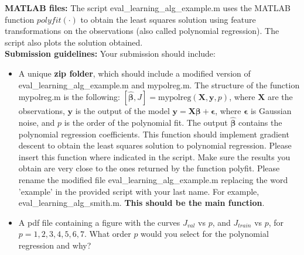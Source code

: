 \documentclass[11pt,oneside,a4paper]{article}
\begin{document}
\begin{enumerate}
\pagebreak
  \textbf{MATLAB files:} The script eval\_learning\_alg\_example.m uses the MATLAB function $polyfit(\cdot)$ to obtain the least squares solution using feature transformations on the observations (also called polynomial regression). The script also plots the solution obtained.
  \\
  \textbf{Submission guidelines:} Your submission should include:
  \begin{itemize}
  	\item A unique \textbf{zip folder}, which should include a modified version of eval\_learning\_alg\_example.m and mypolreg.m. The structure of the function mypolreg.m is the following: $[\hat{\pmb{\beta}}, J]=\text{mypolreg}(\textbf{X},\textbf{y},p)$, where $\textbf{X}$ are the observations, $\textbf{y}$ is the output of the model $\textbf{y}= \textbf{X} \pmb{\beta}+ \pmb{\epsilon}$, where $\pmb{\epsilon}$ is Gaussian noise, and $p$ is the order of the polynomial fit. The output $\hat{\pmb{\beta}}$ contains the polynomial regression coefficients. This function should implement gradient descent to obtain the least squares solution to polynomial regression. Please insert this function where indicated in the script. Make sure the results you obtain are very close to the ones returned by the function polyfit.
  	Please rename the modified file eval\_learning\_alg\_example.m replacing the word 'example' in the provided script with your last name. For example, eval\_learning\_alg\_smith.m. \textbf{This should be the main function}.
  	\item A pdf file containing a figure with the curves $J_{val}$ vs $p$, and $J_{train}$ vs $p$, for $p=1,2,3,4,5,6,7$. What order $p$ would you select for the polynomial regression and why?
  \end{itemize} 
\end{enumerate}
%
%
\end{document}
